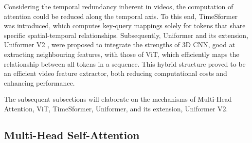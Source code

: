 Considering the temporal redundancy inherent in videos, the computation of attention could be reduced along the temporal axis. To this end, TimeSformer \parencite{bertasius2021space} was introduced, which computes key-query mappings solely for tokens that share specific spatial-temporal relationships. Subsequently, Uniformer \parencite{li2022uniformer} and its extension, Uniformer V2 \parencite{li2022uniformerv2}, were proposed to integrate the strengths of 3D CNN, good at extracting neighbouring features, with those of ViT, which efficiently maps the relationship between all tokens in a sequence. This hybrid structure proved to be an efficient video feature extractor, both reducing computational costs and enhancing performance. 

The subsequent subsections will elaborate on the mechanisms of Multi-Head Attention, ViT, TimeSformer, Uniformer, and its extension, Uniformer V2.


\subsection{Multi-Head Self-Attention}

